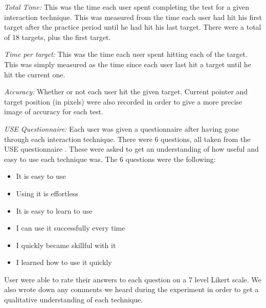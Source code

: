 \textit{Total Time:} This was the time each user spent completing the test for a given interaction technique.  This was measured from the time each user had hit his first target after the practice period until he had hit his last target. There were a total of 18 targets, plus the first target. 

\textit{Time per target:} This was the time each user spent hitting each of the target. This was simply measured as the time since each user last hit a target until he hit the current one.

\textit{Accuracy:} Whether or not each user hit the given target. Current pointer and target position (in pixels) were also recorded in order to give a more precise image of accuracy for each test. 

\textit{USE Questionnaire:} Each user was given a questionnaire after having gone through each interaction technique. There were 6 questions, all taken from the USE questionnaire . These were asked to get an understanding of how useful and easy to use each technique was. The 6 questions were the following: 


\begin{itemize}
	\item It is easy to use
	\item Using it is effortless
	\item It is easy to learn to use
	\item I can use it successfully every time
	\item I quickly became skillful with it
	\item I learned how to use it quickly
\end{itemize}

User were able to rate their answers to each question on a 7 level Likert scale. We also wrote down any comments we heard during the experiment in order to get a qualitative understanding of each technique.  


